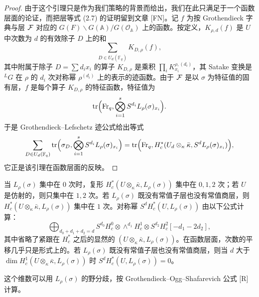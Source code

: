 \begin{proof}
由于这个引理只是作为我们策略的背景而给出，我们在此只满足于一个函数层面的论证，而把层等式 (2.7) 的证明留到文章 [FN]。记 $f$ 为按 Grothendieck 字典与层 $\mathcal F$ 对应的 $G(F)\backslash G(\mathbb A)/G(\mathcal O_{\mathbb A})$ 上的函数。按定义，$K_{\rho,d}(f)$ 是 $U$ 中次数为 $d$ 的有效除子 $D$ 上的和
\[
\sum_{D\in U_d(\mathbb F_q)}K_{D,\rho}(f),
\]
其中附属于除子 $D=\sum d_ix_i$ 的算子 $K_{D,\rho}$ 是乘积 $\prod_iK^{\rho,(d_i)}_{x_i}$，其 Satake 变换是 ${}^LG$ 在 $\rho$ 的 $d_i$ 次对称幂 $\rho^{(d_i)}$ 上的表示的迹函数。由于 $\mathcal F$ 是以 $\sigma$ 为特征值的固有层，$f$ 是每个算子 $K_{D,\rho}$ 的特征函数，特征值为
\[
\operatorname{tr}\Bigl(\mathrm{Fr}_q,\bigotimes_{i=1}^sS^{d_i}L_\rho(\sigma)_{x_i}\Bigr).
\]
于是 Grothendieck–Lefschetz 迹公式给出等式
\[
\sum_{D\in U_d(\mathbb F_q)}\operatorname{tr}\Bigl(\sigma_D,\bigotimes_{i=1}^sS^{d_i}L_\rho(\sigma)_{x_i}\Bigr)
=\operatorname{tr}\Bigl(\mathrm{Fr}_q,H^*_c(U_d\otimes_\kappa\bar\kappa,S^dL_\rho(\sigma)_{x_i})\Bigr),
\]
它正是该引理在函数层面的反映。
\end{proof}

当 $L_\rho(\sigma)$ 集中在 $0$ 次时，复形 $H^*_c(U\otimes_\kappa\bar\kappa,L_\rho(\sigma))$ 集中在 $0,1,2$ 次；若 $U$ 是仿射的，则只集中在 $1,2$ 次。若 $L_\rho(\sigma)$ 既没有常值子层也没有常值商层，则 $H^*_c(U\otimes_\kappa\bar\kappa,L_\rho(\sigma))$ 集中在 $1$ 次。对称幂 $S^dH^*_c(U,L_\rho(\sigma))$ 由以下公式计算：
\[
\bigoplus_{d_0+d_1+d_2=d}S^{d_0}H^0_c\otimes\wedge^{d_1}H^1_c\otimes S^{d_2}H^2_c[-d_1-2d_2],
\]
其中省略了紧跟在 $H^*_c$ 之后的显然的 $(U\otimes_\kappa\bar\kappa,L_\rho(\sigma))$。在函数层面，次数的平移几乎只是形式上的。若 $L_\rho(\sigma)$ 既没有常值子层也没有常值商层，则当 $d$ 大于 $\dim H^1_c(U\otimes_\kappa\bar\kappa,L_\rho(\sigma))$ 时 $S^dH^*_c(U,L_\rho(\sigma))=0$。

这个维数可以用 $L_\rho(\sigma)$ 的野分歧，按 Grothendieck–Ogg–Shafarevich 公式 [R] 计算。
